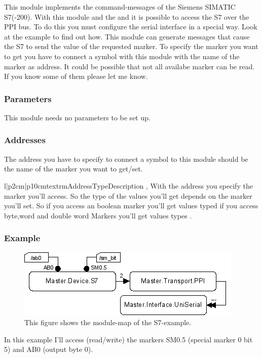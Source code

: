 



%
%
%
This module implements the command-messages of the Siemens SIMATIC S7(-200). 
With this module and the  and 
 it is possible to access the S7 over the 
PPI bus. To do this you must configure the serial interface in a special way. 
Look at the example to find out how. This module can generate messages that 
cause the S7 to send the value of the requested marker. To specify the marker 
you want to get you have to connect a symbol with this module with the name of
the marker as address. It could be possible that not all availabe marker can be
read. If you know some of them please let me know.

\subsubsection{Parameters}
This module needs no parameters to be set up.

\subsubsection{Addresses}
The address you have to specify to connect a symbol to this module should be 
the name of the marker you want to get/set.
\begin{tableiii}{l|p{2cm}|p{10cm}}{textrm}{Address}{Type}{Description}
        {, }
        {With the address you specify the marker you'll access. So the type 
         of the values you'll get depends on the marker you'll set. So if you 
         access an boolean marker you'll get values typed  if you
         access byte,word and double word Markers you'll get values types
         .}
\end{tableiii}

\subsubsection{Example}
\begin{figure}[ht]
    \label{fig:coremod08}
    \centering
    \includegraphics{coremod08.png}
    \caption{This figure shows the module-map of the S7-example.}
\end{figure}    
In this example I'll access (read/write) the markers SM0.5 (special marker 0 bit 5) and AB0
(output byte 0).

